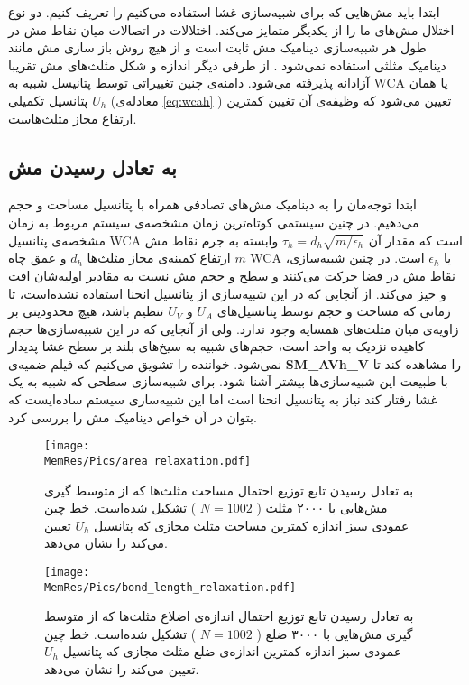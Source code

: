 ابتدا باید مش‌هایی که برای شبیه‌سازی غشا استفاده می‌کنیم را تعریف کنیم. دو نوع اختلال مش‌های ما را از یکدیگر متمایز می‌کند. اختلالات در اتصالات میان نقاط مش در طول هر شبیه‌سازی دینامیک مش ثابت است و از هیچ روش باز سازی مش مانند دینامیک مثلثی استفاده نمی‌شود
\cite{Boal1992PRA, Gompper1992Science}
. از طرفی دیگر اندازه و شکل مثلث‌های مش تقریبا آزادانه پذیرفته می‌شود. دامنه‌ی چنین تغییراتی توسط پتانیسل شبیه به 
WCA 
یا همان پتانسیل تکمیلی 
$U_h$
(معادله‌ی 
\ref{eq:wcah}
) تعیین می‌شود که وظیفه‌ی آن تغیین کمترین ارتفاع مجاز مثلث‌هاست. 


\subsection{\label{sec:MeshEquilibration}
به تعادل رسیدن مش
}

ابتدا توجه‌مان را به دینامیک مش‌های تصادفی همراه با پتانسیل مساحت و حجم می‌دهیم. در چنین سیستمی کوتاه‌ترین زمان مشخصه‌ی سیستم مربوط به زمان مشخصه‌ی پتانسیل 
WCA
است که مقدار آن
 $\tau_h=d_h\sqrt{m/\epsilon_h}$
وابسته به جرم نقاط مش
$m$
ارتفاع کمینه‌ی مجاز مثلث‌ها
$d_h$
و عمق چاه 
WCA
یا 
$\epsilon_h$
است. در چنین شبیه‌سازی، نقاط مش در فضا حرکت می‌کنند و سطح و حجم مش نسبت به مقادیر اولیه‌شان افت و خیز می‌کند. از آنجایی که در این شبیه‌سازی از پتانسیل انحنا استفاده نشده‌است، تا زمانی که مساحت و حجم توسط پتانسیل‌های
$U_A$
و
$U_V$
تنظیم باشد، هیچ محدودیتی بر زاویه‌ی میان مثلث‌های همسایه وجود ندارد. ولی از آنجایی که در این شبیه‌سازی‌ها حجم کاهیده نزدیک به واحد است، حجم‌های شبیه به سیخ‌های بلند بر سطح غشا پدیدار نمی‌شود. خواننده را تشویق می‌کنیم که فیلم ضمیه‌ی 
\textbf{SM\_AVh\_V}
را مشاهده کند تا با طبیعت این شبیه‌سازی‌ها بیشتر آشنا شود. برای شبیه‌سازی سطحی که شبیه‌ به یک غشا رفتار کند نیاز به پتانسیل انحنا است اما این شبیه‌سازی سیستم ساده‌ایست که بتوان در آن خواص دینامیک مش را بررسی کرد.
\begin{figure}[htbp]
\begin{center}
\texttt{[image: \\MemRes/Pics/area\_relaxation.pdf]}
\caption{
به تعادل رسیدن تابع توزیع احتمال مساحت مثلث‌ها که از متوسط گیری مش‌هایی با ۲۰۰۰ مثلث (
$N=1002$
) تشکیل شده‌است. خط چین عمودی سبز اندازه کمترین مساحت مثلث مجازی که پتانسیل
$U_h$
تعیین می‌کند را نشان می‌دهد.
}
\label{fig:areaRelaxation}
\end{center}
\end{figure}


\begin{figure}[htbp]
\begin{center}
\texttt{[image: \\MemRes/Pics/bond\_length\_relaxation.pdf]}
\caption{
به تعادل رسیدن تابع توزیع احتمال اندازه‌ی اضلاع مثلث‌ها که از متوسط گیری مش‌هایی با ۳۰۰۰ ضلع (
$N=1002$
) تشکیل شده‌است. خط چین عمودی سبز اندازه کمترین اندازه‌ی ضلع مثلث مجازی که پتانسیل
$U_h$
تعیین می‌کند را نشان می‌دهد.
}
\label{fig:bondRelaxation}
\end{center}
\end{figure}

